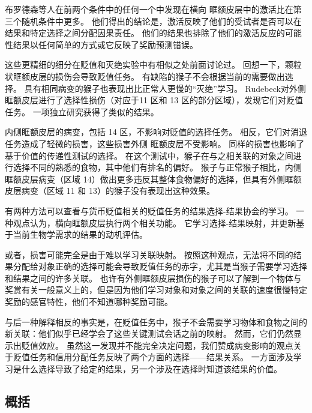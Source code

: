 布罗德森等人在前两个条件中的任何一个中发现在横向 眶额皮层中的激活比在第三个随机条件中更多。
他们得出的结论是，激活反映了他们的受试者是否可以在结果和特定选择之间分配因果责任。
他们的结果也排除了他们的激活反应的可能性结果以任何简单的方式或它反映了奖励预测错误。\par


这些更精细的细分在贬值和灭绝实验中有相似之处前面讨论过。
回想一下，颗粒状眶额皮层的损伤会导致贬值任务。
有缺陷的猴子不会根据当前的需要做出选择。
具有相同病变的猴子也表现出比正常人更慢的“灭绝”学习。
Rudebeck\cite{rudebeck2011dissociable}对外侧眶额皮层进行了选择性损伤（对应于11 区和 13 区的部分区域），发现它们对贬值任务。
一项独立研究获得了类似的结果\cite{machado2007effects}。\par


内侧眶额皮层的病变，包括 14 区，不影响对贬值的选择任务。
相反，它们对消退任务造成了轻微的损害，这些损害外侧 眶额皮层不受影响。
同样的损害也影响了基于价值的传递性测试的选择。
在这个测试中，猴子在与之相关联的对象之间进行选择不同的熟悉的食物，其中他们有排名的偏好。
猴子与正常猴子相比，内侧眶额皮层病变（区域 14）做出更多违反其整体食物偏好的选择，但具有外侧眶额皮层病变（区域 11 和 13）的猴子没有表现出这种效果\cite{rudebeck2011dissociable}。\par


有两种方法可以查看与货币贬值相关的贬值任务的结果选择-结果协会的学习。
一种观点认为，横向眶额皮层执行两个相关功能。
它学习选择-结果映射，并更新基于当前生物学需求的结果的动机评估。\par


或者，损害可能完全是由于难以学习关联映射。
按照这种观点，无法将不同的结果分配给对象正确的选择可能会导致贬值任务的赤字，尤其是当猴子需要学习选择和结果之间的许多关联。
也许有外侧眶额皮层损伤的猴子可以了解到一个物体与奖赏有关一般意义上的，但是因为他们学习对象和对象之间的关联的速度很慢特定奖励的感官特性，他们不知道哪种奖励可能。\par


与后一种解释相反的事实是，在贬值任务中，猴子不会需要学习物体和食物之间的新关联：他们似乎已经学会了这些关键测试会话之前的映射。
然而，它们仍然显示出贬值效应。
虽然这一发现并不能完全决定问题，我们赞成病变影响的观点关于贬值任务和信用分配任务反映了两个方面的选择——结果关系。
一方面涉及学习是什么选择导致了给定的结果，另一个涉及在选择时知道该结果的价值。\par



\subsection{概括}

